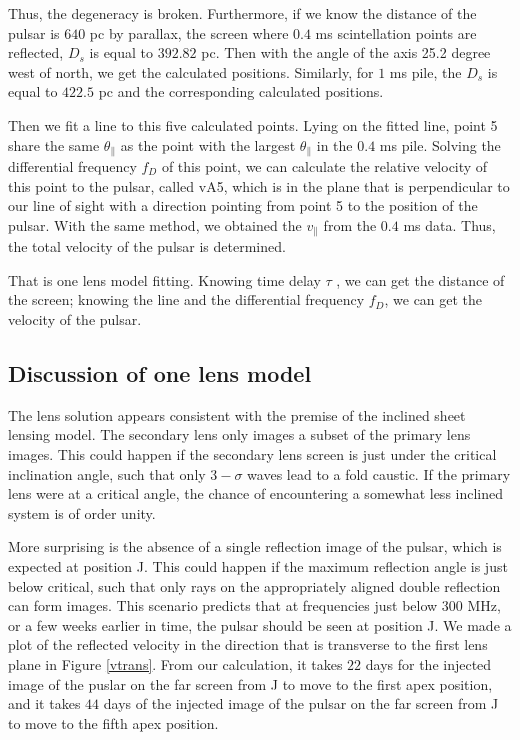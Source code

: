 \documentclass[useAMS,usenatbib]{mn2e}
\begin{document}
Thus, the degeneracy is broken. Furthermore, if we know the distance of the pulsar is $640$ pc by parallax,
the screen where $0.4$ ms scintellation points are reflected, $D_s$ is equal to $392.82$ pc. Then with the angle of the axis 25.2 degree west of north, we get the calculated positions.
Similarly, for $1$ ms pile, the $D_s$ is equal to $422.5$ pc and the corresponding calculated positions.

Then we fit a line to this five calculated points. Lying on the fitted line, point 5 share the same $\theta_{\parallel}$ as the point with the largest $\theta_{\parallel}$ in the $0.4$ ms pile. Solving the differential frequency ${f_D}$ of this point, we can calculate the relative velocity of this point to the pulsar, called vA5, which is in the plane that is perpendicular to our line of sight with a direction pointing from point 5 to the position of the pulsar. With the same method, we obtained the $v_{\parallel}$ from the $0.4$ ms data. Thus, the total velocity of the pulsar is determined.

That is one lens model fitting. Knowing time delay ${\tau}$ , we can get the distance of the screen; knowing the line and the differential frequency ${f_D}$, we can get the velocity of the pulsar.
\subsection{Discussion of one lens model}

The lens solution appears consistent with the premise of the inclined
sheet lensing model\citep{2014MNRAS.442.3338P}.  The secondary lens
only images a subset of the primary lens images.  This could happen if
the secondary lens screen is just under the critical inclination
angle, such that only $3-\sigma$ waves lead to a fold caustic.  If the
primary lens were at a critical angle, the chance of encountering a
somewhat less inclined system is of order unity.

More surprising is the absence of a single reflection image of the
pulsar, which is expected at position J.  This could happen if the
maximum reflection angle is just below critical, such that only rays
on the appropriately aligned double reflection can form images.  This
scenario predicts that at frequencies just below $300$ MHz, or a few
weeks earlier in time, the pulsar should be seen at position J. We made a plot of the reflected velocity in the direction that is transverse to the first lens plane in Figure \ref{vtrans}.
From our calculation, it takes $22$ days for the injected image of the puslar on the far screen from J to move to the first apex position, and it takes $44$ days of the injected image of the pulsar on the far screen from J to move to the fifth apex position.
\end{document}
